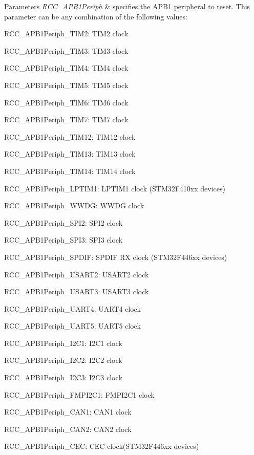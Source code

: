 \begin{DoxyParams}{Parameters}
{\em R\+C\+C\+\_\+\+A\+P\+B1\+Periph} & specifies the A\+P\+B1 peripheral to reset. This parameter can be any combination of the following values\+: \begin{DoxyItemize}
\item R\+C\+C\+\_\+\+A\+P\+B1\+Periph\+\_\+\+T\+I\+M2\+: T\+I\+M2 clock \item R\+C\+C\+\_\+\+A\+P\+B1\+Periph\+\_\+\+T\+I\+M3\+: T\+I\+M3 clock \item R\+C\+C\+\_\+\+A\+P\+B1\+Periph\+\_\+\+T\+I\+M4\+: T\+I\+M4 clock \item R\+C\+C\+\_\+\+A\+P\+B1\+Periph\+\_\+\+T\+I\+M5\+: T\+I\+M5 clock \item R\+C\+C\+\_\+\+A\+P\+B1\+Periph\+\_\+\+T\+I\+M6\+: T\+I\+M6 clock \item R\+C\+C\+\_\+\+A\+P\+B1\+Periph\+\_\+\+T\+I\+M7\+: T\+I\+M7 clock \item R\+C\+C\+\_\+\+A\+P\+B1\+Periph\+\_\+\+T\+I\+M12\+: T\+I\+M12 clock \item R\+C\+C\+\_\+\+A\+P\+B1\+Periph\+\_\+\+T\+I\+M13\+: T\+I\+M13 clock \item R\+C\+C\+\_\+\+A\+P\+B1\+Periph\+\_\+\+T\+I\+M14\+: T\+I\+M14 clock \item R\+C\+C\+\_\+\+A\+P\+B1\+Periph\+\_\+\+L\+P\+T\+I\+M1\+: L\+P\+T\+I\+M1 clock (S\+T\+M32\+F410xx devices) \item R\+C\+C\+\_\+\+A\+P\+B1\+Periph\+\_\+\+W\+W\+DG\+: W\+W\+DG clock \item R\+C\+C\+\_\+\+A\+P\+B1\+Periph\+\_\+\+S\+P\+I2\+: S\+P\+I2 clock \item R\+C\+C\+\_\+\+A\+P\+B1\+Periph\+\_\+\+S\+P\+I3\+: S\+P\+I3 clock \item R\+C\+C\+\_\+\+A\+P\+B1\+Periph\+\_\+\+S\+P\+D\+IF\+: S\+P\+D\+IF RX clock (S\+T\+M32\+F446xx devices) \item R\+C\+C\+\_\+\+A\+P\+B1\+Periph\+\_\+\+U\+S\+A\+R\+T2\+: U\+S\+A\+R\+T2 clock \item R\+C\+C\+\_\+\+A\+P\+B1\+Periph\+\_\+\+U\+S\+A\+R\+T3\+: U\+S\+A\+R\+T3 clock \item R\+C\+C\+\_\+\+A\+P\+B1\+Periph\+\_\+\+U\+A\+R\+T4\+: U\+A\+R\+T4 clock \item R\+C\+C\+\_\+\+A\+P\+B1\+Periph\+\_\+\+U\+A\+R\+T5\+: U\+A\+R\+T5 clock \item R\+C\+C\+\_\+\+A\+P\+B1\+Periph\+\_\+\+I2\+C1\+: I2\+C1 clock \item R\+C\+C\+\_\+\+A\+P\+B1\+Periph\+\_\+\+I2\+C2\+: I2\+C2 clock \item R\+C\+C\+\_\+\+A\+P\+B1\+Periph\+\_\+\+I2\+C3\+: I2\+C3 clock \item R\+C\+C\+\_\+\+A\+P\+B1\+Periph\+\_\+\+F\+M\+P\+I2\+C1\+: F\+M\+P\+I2\+C1 clock \item R\+C\+C\+\_\+\+A\+P\+B1\+Periph\+\_\+\+C\+A\+N1\+: C\+A\+N1 clock \item R\+C\+C\+\_\+\+A\+P\+B1\+Periph\+\_\+\+C\+A\+N2\+: C\+A\+N2 clock \item R\+C\+C\+\_\+\+A\+P\+B1\+Periph\+\_\+\+C\+EC\+: C\+EC clock(\+S\+T\+M32\+F446xx devices) \item 
\end{DoxyItemize}
\end{DoxyParams}
